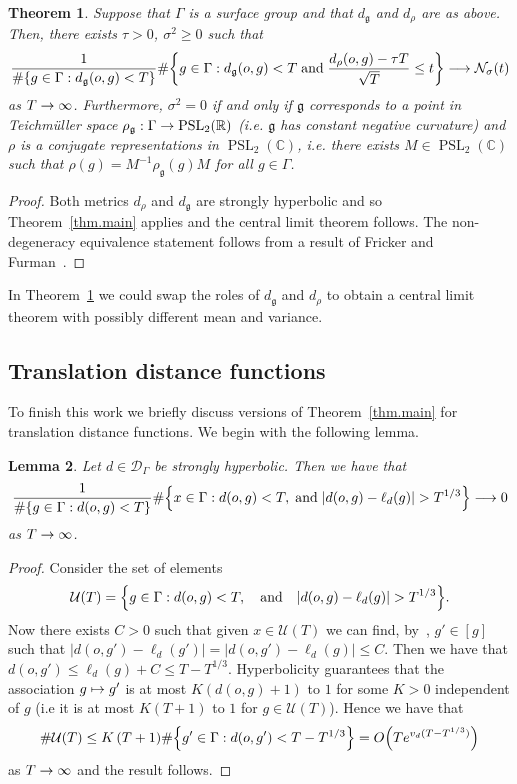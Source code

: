 \documentclass[10pt]{amsart}
\newtheorem{theo}{Theorem}[section]
\newtheorem{lemm}[theo]{Lemma}\newtheorem{prop}[theo]{Proposition}\newtheorem{coro}[theo]{Corollary}\newtheorem{conj}[theo]{Conjecture}
\theoremstyle{definition}\newtheorem{defi}[theo]{Definition}\newtheorem{rema}[theo]{Remark}\newtheorem{exam}[theo]{Example}\newtheorem{exem}[theo]{Example}\newtheorem{nota}[theo]{Notation}
\newcommand{\G}{\Gamma}
\newcommand{\fkg}{\mathfrak{g}}
\newcommand{\Dc}{\mathcal{D}}
\newcommand{\Uc}{\mathcal{U}}
\newcommand{\Nc}{\mathcal{N}}
\newcommand{\C}{\mathbb{C}}
\newcommand{\R}{\mathbb{R}}
\DeclareMathOperator{\PSL}{PSL}
\let\originalleft\left
\let\originalright\right
\renewcommand{\left}{\mathopen{}\mathclose\bgroup\originalleft}
\renewcommand{\right}{\aftergroup\egroup\originalright}
\renewcommand*{\to}{\mathchoice{\longrightarrow}{\rightarrow}{\rightarrow}{\rightarrow}}
\let\oldmapsto\mapsto
\renewcommand*{\mapsto}{\mathchoice{\longmapsto}{\oldmapsto}{\oldmapsto}{\oldmapsto}}
\theoremstyle{plain}
\begin{document}
\begin{theo}\label{theo4.2}
Suppose that $\G$ is a surface group and that $d_\fkg$ and $d_\rho$ are as above. Then, there exists $\tau > 0$, $\sigma^2 \ge 0$ such that
\begin{align*}
\frac{1}{\#\{ g\in\G : d_\fkg(o,g) < T\}}
 \#\left\{ g\in\G : d_\fkg(o,g) < T \; \text{and} \; \frac{d_{\rho}(o,g) - \tau T}{\sqrt{T}} \le t \right\} \to \Nc_\sigma(t)
\end{align*}
as $T\to\infty$. Furthermore, $\sigma^2 = 0$ if and only if $\fkg$ corresponds to a point in Teichm\"uller space $\rho_\fkg : \G \to \PSL_2(\R)$ (i.e. $\fkg$ has constant negative curvature) and $\rho$ is a conjugate representations in $\PSL_2(\C)$, i.e. there exists $M \in \PSL_2(\C)$ such that $\rho(g) = M^{-1}\rho_\fkg(g) M$ for all $g \in \G$.
\end{theo}

\begin{proof}
Both metrics $d_\rho$ and $d_\fkg$ are strongly hyperbolic and so Theorem~\ref{thm.main} applies and the central limit theorem follows. The non-degeneracy equivalence statement follows from a result of Fricker and Furman~\cite[Theorem~A]{fricker.furman}.
\end{proof}

In Theorem~\ref{theo4.2} we could swap the roles of $d_\fkg$ and $d_\rho$ to obtain a central limit theorem with possibly different mean and variance.

\subsection{Translation distance functions}

To finish this work we briefly discuss versions of Theorem~\ref{thm.main} for translation distance functions. We begin with the following lemma.

\begin{lemm}
Let $d \in \Dc_\G$ be strongly hyperbolic. Then we have that
\begin{align*}
\frac{1}{\#\{g \in \G: d(o,g) < T\}}
 \#\left\{x\in\G: d(o,g) < T, \;\text{and}\;
|d(o,g) - \ell_d(g)| > T^{1/3} \right\} \to 0
\end{align*}
as $T\to\infty$.
\end{lemm}
\begin{proof}
Consider the set of elements
\[
\Uc(T) = \left\{g\in\G: d(o,g) < T,  \quad\text{and}\quad |d(o,g) - \ell_d(g)| > T^{1/3} \right\}.
\]
Now there exists $C>0$ such that given $x \in \Uc(T)$ we can find, by~\cite[Lemma~3.2]{cantrell.tanaka.1}, $g' \in [g]$ such that $|d(o,g') - \ell_d(g')| = |d(o,g') - \ell_d(g)| \le C$. Then we have that $d(o,g') \le \ell_d(g) + C \le T - T^{1/3}$. Hyperbolicity guarantees that the association $g \mapsto g'$ is at most $K (d(o,g) + 1) $ to $1$ for some $K > 0$ independent of $g$ (i.e it is at most $K(T+1)$ to $1$ for $g\in \Uc(T)$). Hence we have that
\[
\#\Uc(T) \le K \, (T+1)\#\left\{g' \in \G: d(o,g') < T- T^{1/3} \right\} = O\left(T e^{v_d(T-T^{1/3})}\right)
\]
as $T\to\infty$ and the result follows.
\end{proof}
\end{document}
